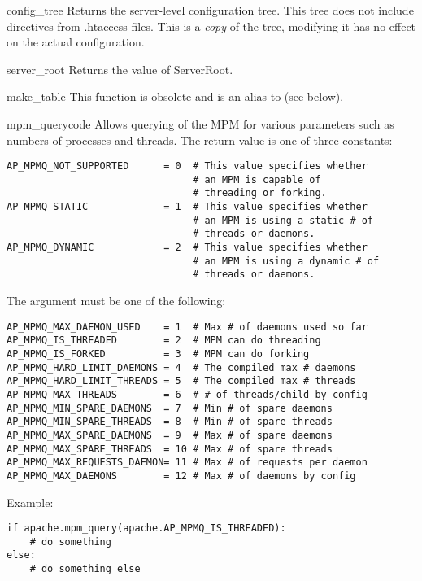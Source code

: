 \begin{funcdesc}{config_tree}{}
  Returns the server-level configuration tree. This tree does not
  include directives from .htaccess files. This is a \emph{copy} of
  the tree, modifying it has no effect on the actual configuration.
\end{funcdesc}

\begin{funcdesc}{server_root}{}
  Returns the value of ServerRoot.
\end{funcdesc}

\begin{funcdesc}{make_table}{} 
  This function is obsolete and is an alias to  (see below).
\end{funcdesc}

\begin{funcdesc}{mpm_query}{code}
  Allows querying of the MPM for various parameters such as numbers of
  processes and threads. The return value is one of three constants:
  \begin{verbatim}
AP_MPMQ_NOT_SUPPORTED      = 0  # This value specifies whether 
                                # an MPM is capable of         
                                # threading or forking.        
AP_MPMQ_STATIC             = 1  # This value specifies whether 
                                # an MPM is using a static # of
                                # threads or daemons.          
AP_MPMQ_DYNAMIC            = 2  # This value specifies whether 
                                # an MPM is using a dynamic # of
                                # threads or daemons.          
  \end{verbatim}

  The  argument must be one of the following:
  \begin{verbatim}
AP_MPMQ_MAX_DAEMON_USED    = 1  # Max # of daemons used so far 
AP_MPMQ_IS_THREADED        = 2  # MPM can do threading         
AP_MPMQ_IS_FORKED          = 3  # MPM can do forking           
AP_MPMQ_HARD_LIMIT_DAEMONS = 4  # The compiled max # daemons   
AP_MPMQ_HARD_LIMIT_THREADS = 5  # The compiled max # threads   
AP_MPMQ_MAX_THREADS        = 6  # # of threads/child by config 
AP_MPMQ_MIN_SPARE_DAEMONS  = 7  # Min # of spare daemons       
AP_MPMQ_MIN_SPARE_THREADS  = 8  # Min # of spare threads       
AP_MPMQ_MAX_SPARE_DAEMONS  = 9  # Max # of spare daemons       
AP_MPMQ_MAX_SPARE_THREADS  = 10 # Max # of spare threads       
AP_MPMQ_MAX_REQUESTS_DAEMON= 11 # Max # of requests per daemon 
AP_MPMQ_MAX_DAEMONS        = 12 # Max # of daemons by config   
  \end{verbatim}

Example:
  \begin{verbatim}
if apache.mpm_query(apache.AP_MPMQ_IS_THREADED):
    # do something
else:
    # do something else
  \end{verbatim}
\end{funcdesc}

